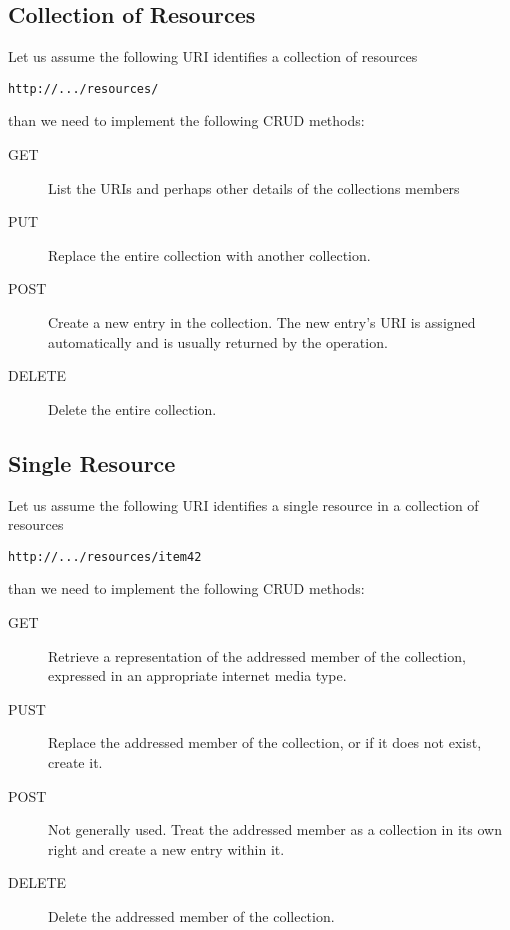 \subsection{Collection of Resources}

Let us assume the following URI identifies a collection of resources

\verb|http://.../resources/|

than we need to implement the following CRUD methods:

\begin{description} 
    \item[GET] List the URIs and perhaps other details of the
      collections members
    \item[PUT] Replace the entire collection with another collection.
    \item[POST] Create a new entry in the collection. The new entry's
      URI is assigned automatically and is usually returned by the
      operation.
    \item[DELETE] Delete the entire collection.
\end{description} 


\subsection{Single Resource}

Let us assume the following URI identifies a single resource in a
collection of resources

\verb|http://.../resources/item42|

than we need to implement the following CRUD methods:

    \begin{description} 

    \item[GET] Retrieve a representation of the addressed member of
      the collection, expressed in an appropriate internet media type.

    \item[PUST] Replace the addressed member of the collection, or if
      it does not exist, create it.

    \item[POST] Not generally used. Treat the addressed member as a
      collection in its own right and create a new entry within it.
                               
    \item[DELETE] Delete the addressed member of the collection. 
\end{description} 

